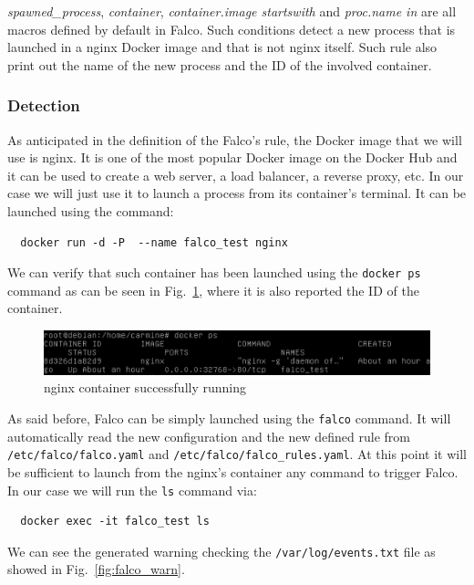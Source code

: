 \documentclass[a4paper,12pt]{article}
\newcommand{\file}[1]{\texttt{#1}\xspace}
\newcommand{\code}[1]{\lstinline|#1|}
\def\myfig#1{Fig.~#1\xspace}
\begin{document}
\textit{spawned\_process}, \textit{container}, \textit{container.image
startswith} and \textit{proc.name in} are all macros defined by default in
Falco. Such conditions detect a new process that is launched in a nginx Docker
image and that is not nginx itself. Such rule also print out the name of the new
process and the ID of the involved container.

\subsubsection{Detection}

As anticipated in the definition of the Falco's rule, the Docker image that we
will use is nginx. It is one of the most popular Docker image on the Docker Hub
and it can be used to create a web server, a load balancer, a reverse proxy, etc.
In our case we will just use it to launch a process from its container's
terminal. It can be launched using the command:

\begin{lstlisting}
  docker run -d -P  --name falco_test nginx
\end{lstlisting}

We can verify that such container has been launched using the \code{docker ps}
command as can be seen in \myfig{\ref{fig:nginx_launched}}, where it is also
reported the ID of the container.

\begin{figure}[ht!]
  \centerline{\includegraphics[width=1\textwidth]{nginx_launched.png}}
  \caption{nginx container successfully running}
  \label{fig:nginx_launched}
  \end{figure}

As said before, Falco can be simply launched using the \code{falco} command.
It will automatically read the new configuration and the new defined rule from
\file{/etc/falco/falco.yaml} and \file{/etc/falco/falco\_rules.yaml}. At
this point it will be sufficient to launch from the nginx's container any
command to trigger Falco. In our case we will run the \code{ls} command via: 
\begin{lstlisting}
  docker exec -it falco_test ls
\end{lstlisting}

We can see the generated warning checking the \file{/var/log/events.txt} file
as showed in \myfig{\ref{fig:falco_warn}}.
\end{document}
